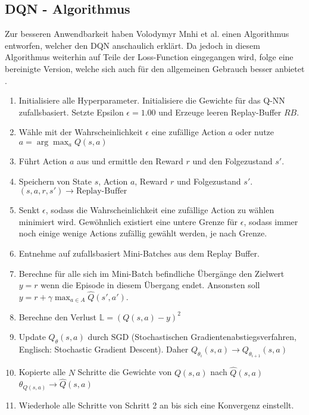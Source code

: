\subsection{DQN - Algorithmus} \label{alg:DQN}
Zur besseren Anwendbarkeit haben Volodymyr Mnhi et al. einen Algorithmus entworfen, welcher den DQN anschaulich erklärt. Da jedoch in diesem Algorithmus weiterhin auf Teile der Loss-Function eingegangen wird, folge eine bereinigte Version, welche sich auch für den allgemeinen Gebrauch besser anbietet \cite[S. 149 f.]{DRL_Lapan}.
\begin{enumerate} 
	\item Initialisiere alle Hyperparameter. Initialisiere die Gewichte für das Q-NN zufallsbasiert. Setzte Epsilon $\epsilon = 1.00$ und Erzeuge leeren Replay-Buffer $RB$.
	\item Wähle mit der Wahrscheinlichkeit $\epsilon$  eine zufällige Action $a$ oder nutze $a = \arg\max_{a} Q(s,a)$
	\item Führt Action $a$ aus und ermittle den Reward $r$ und den Folgezustand $s'$.
	\item Speichern von State $s$, Action $a$, Reward $r$ und Folgezustand $s'$. $(s,a,r,s') \longrightarrow \text{Replay-Buffer}$
	\item Senkt $\epsilon$, sodass die Wahrscheinlichkeit eine zufällige Action zu wählen minimiert wird. Gewöhnlich existiert eine untere Grenze für $\epsilon$, sodass immer noch einige wenige Actions zufällig gewählt werden, je nach Grenze.
	\item Entnehme auf zufallsbasiert Mini-Batches aus dem Replay Buffer.
	\item Berechne für alle sich im Mini-Batch befindliche Übergänge den Zielwert $y = r$ wenn die Episode in diesem Übergang endet. Ansonsten soll $y = r + \gamma \max_{a \in A}\hat{Q}(s',a')$.
	\item Berechne den Verlust $\mathbb{L} = (Q(s,a) - y)^2$
	\item Update $Q_\theta(s,a)$ durch SGD (Stochastischen Gradientenabstiegsverfahren, Englisch: Stochastic Gradient Descent). Daher $Q_{\theta_{i}}(s,a) \longrightarrow Q_{\theta_{i+1}}(s,a)$
	\item Kopierte alle $N$ Schritte die Gewichte von $Q(s,a)$ nach $\hat{Q}(s,a)$ $\theta_{Q(s,a)} \longrightarrow \hat{Q}(s,a)$
	\item Wiederhole alle Schritte von Schritt 2 an bis sich eine Konvergenz einstellt.
\end{enumerate}
